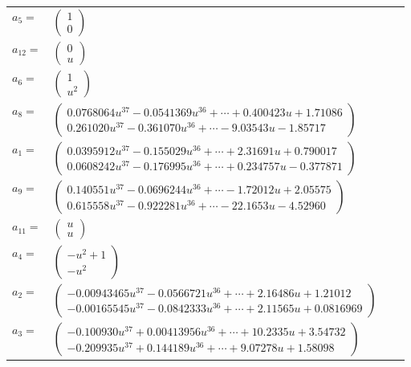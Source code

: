 \documentclass[1p]{elsarticle_modified}
\theoremstyle{definition}
\begin{document}
\begin{tabular}{m{7pt} m{180pt} m{7pt} m{180pt} }
\flushright $a_{5}=$&$\begin{pmatrix}1\\0\end{pmatrix}$ \\
\flushright $a_{12}=$&$\begin{pmatrix}0\\u\end{pmatrix}$ \\
\flushright $a_{6}=$&$\begin{pmatrix}1\\u^2\end{pmatrix}$ \\
\flushright $a_{8}=$&$\begin{pmatrix}0.0768064 u^{37}-0.0541369 u^{36}+\cdots+0.400423 u+1.71086\\0.261020 u^{37}-0.361070 u^{36}+\cdots-9.03543 u-1.85717\end{pmatrix}$ \\
\flushright $a_{1}=$&$\begin{pmatrix}0.0395912 u^{37}-0.155029 u^{36}+\cdots+2.31691 u+0.790017\\0.0608242 u^{37}-0.176995 u^{36}+\cdots+0.234757 u-0.377871\end{pmatrix}$ \\
\flushright $a_{9}=$&$\begin{pmatrix}0.140551 u^{37}-0.0696244 u^{36}+\cdots-1.72012 u+2.05575\\0.615558 u^{37}-0.922281 u^{36}+\cdots-22.1653 u-4.52960\end{pmatrix}$ \\
\flushright $a_{11}=$&$\begin{pmatrix}u\\u\end{pmatrix}$ \\
\flushright $a_{4}=$&$\begin{pmatrix}- u^2+1\\- u^2\end{pmatrix}$ \\
\flushright $a_{2}=$&$\begin{pmatrix}-0.00943465 u^{37}-0.0566721 u^{36}+\cdots+2.16486 u+1.21012\\-0.00165545 u^{37}-0.0842333 u^{36}+\cdots+2.11565 u+0.0816969\end{pmatrix}$ \\
\flushright $a_{3}=$&$\begin{pmatrix}-0.100930 u^{37}+0.00413956 u^{36}+\cdots+10.2335 u+3.54732\\-0.209935 u^{37}+0.144189 u^{36}+\cdots+9.07278 u+1.58098\end{pmatrix}$ \\

\end{tabular}
\end{document}
